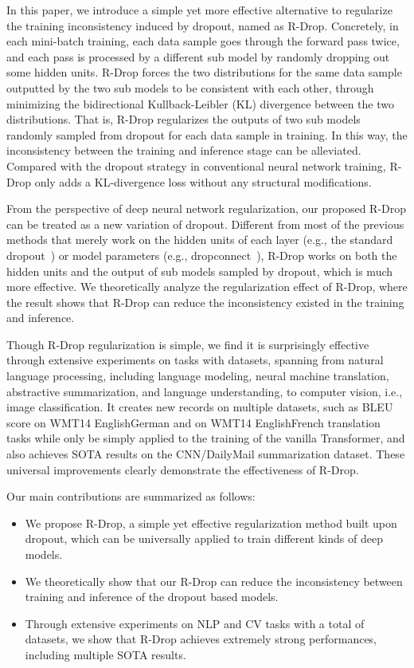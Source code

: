 \documentclass{article}
\begin{document}
In this paper, we introduce a simple yet more effective alternative to regularize the training inconsistency induced by dropout, named as R-Drop.
Concretely, in each mini-batch training, each data sample goes through the forward pass twice, and each pass is processed by a different sub model by randomly dropping out some hidden units. 
R-Drop forces the two distributions for the same data sample outputted by the two sub models to be consistent with each other, through minimizing the bidirectional Kullback-Leibler (KL) divergence between the two distributions. 
That is, R-Drop regularizes the outputs of two sub models randomly sampled from dropout for each data sample in training. 
In this way, the inconsistency between the training and inference stage can be alleviated.
Compared with the dropout strategy in conventional neural network training, R-Drop only adds a KL-divergence loss without any structural modifications. 

From the perspective of deep neural network regularization, our proposed R-Drop can be treated as a new variation of dropout.
Different from most of the previous methods that merely work on the hidden units of each layer (e.g., the standard dropout~\cite{hinton2012improving}) or model parameters (e.g., dropconnect~\cite{wan2013regularization}), R-Drop works on both the hidden units and the output of sub models sampled by dropout, which is much more effective.
We theoretically analyze the regularization effect of R-Drop, where the result shows that R-Drop can reduce the inconsistency existed in the training and inference.


Though R-Drop regularization is simple, we find it is surprisingly effective through extensive experiments on  tasks with  datasets, spanning from natural language processing, including language modeling, neural machine translation, abstractive summarization, and language understanding, to computer vision, i.e.,  image classification. It creates new records on multiple datasets, such as  BLEU score on WMT14 EnglishGerman and  on WMT14 EnglishFrench translation tasks while only be simply applied to the training of the vanilla Transformer, and also achieves SOTA results on the CNN/DailyMail summarization dataset. 
These universal improvements clearly demonstrate the effectiveness of R-Drop.

Our main contributions are summarized as follows: 
\begin{itemize}
    \item We propose R-Drop, a simple yet effective regularization method built upon dropout, which can be universally applied to train different kinds of deep models. 
    \item We theoretically show that our R-Drop can reduce the inconsistency between training and inference of the dropout based models.
    \item Through extensive experiments on  NLP and  CV tasks with a total of  datasets, we show that R-Drop achieves extremely strong performances, including multiple SOTA results. 
\end{itemize}
\end{document}

